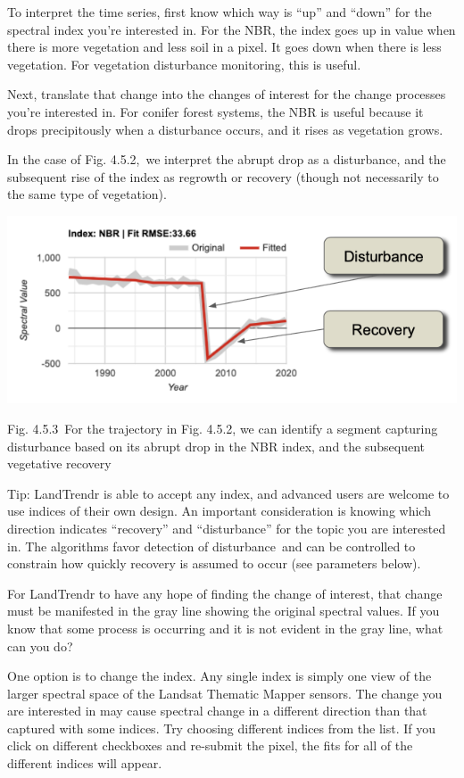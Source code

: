 \documentclass[
  letterpaper,
  DIV=11,
  numbers=noendperiod]{scrreprt}
\begin{document}
To interpret the time series, first know which way is ``up'' and
``down'' for the spectral index you're interested in. For the NBR, the
index goes up in value when there is more vegetation and less soil in a
pixel. It goes down when there is less vegetation. For vegetation
disturbance monitoring, this is useful.

Next, translate that change into the changes of interest for the change
processes you're interested in. For conifer forest systems, the NBR is
useful because it drops precipitously when a disturbance occurs, and it
rises as vegetation grows. ~

In the case of Fig. 4.5.2,~we interpret the abrupt drop as a
disturbance, and the subsequent rise of the index as regrowth or
recovery (though not necessarily to the same type of vegetation).

\includegraphics{./F4/image71.png}

Fig. 4.5.3~For the trajectory in Fig. 4.5.2, we can identify a segment
capturing disturbance based on its abrupt drop in the NBR index, and the
subsequent vegetative recovery

Tip: LandTrendr is able to accept any index, and advanced users are
welcome to use indices of their own design. An important consideration
is knowing which direction indicates ``recovery'' and ``disturbance''
for the topic you are interested in. The algorithms favor detection of
disturbance~and can be controlled to constrain how quickly recovery is
assumed to occur (see parameters below). ~

For LandTrendr to have any hope of finding the change of interest, that
change must be manifested in the gray line showing the original spectral
values. If you know that some process is occurring and it is not evident
in the gray line, what can you do?

One option is to change the index. Any single index is simply one view
of the larger spectral space of the Landsat Thematic Mapper sensors. The
change you are interested in may cause spectral change in a different
direction than that captured with some indices. Try choosing different
indices from the list. If you click on different checkboxes and
re-submit the pixel, the fits for all of the different indices will
appear.
\end{document}
